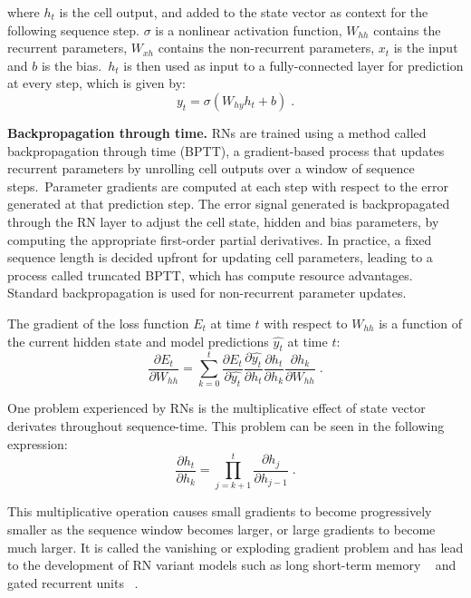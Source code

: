 \noindent where $ h_t $ is the cell output, and added to the state vector as context for the following sequence step. $ \sigma $ is a nonlinear activation function, $ W_{hh} $ contains the recurrent parameters, $ W_{xh }$ contains the non-recurrent parameters, $ x_t $ is the input and $ b $ is the bias.\ $ h_t $ is then used as input to a fully-connected layer for prediction at every step, which is given by:
\begin{equation}
	y_t = \sigma(W_{hy}h_{t} + b) \; .
\end{equation}

\noindent \textbf{Backpropagation through time.} RNs are trained using a method called backpropagation through time (BPTT),  a gradient-based process that updates recurrent parameters by unrolling cell outputs over a window of sequence steps.\ Parameter gradients are computed at each step with respect to the error generated at that prediction step. The error signal generated is backpropagated through the RN layer to adjust the cell state, hidden and bias parameters, by computing the appropriate first-order partial derivatives. In practice, a fixed sequence length is decided upfront for updating cell parameters, leading to a process called truncated BPTT, which has compute resource advantages. Standard backpropagation is used for non-recurrent parameter updates. \par

\noindent The gradient of the loss function $ E_t $ at time $ t $ with respect to $ W_{hh} $ is a function of the current hidden state and model predictions $\hat{y_t}$ at time $ t $:  
\begin{equation}
	\frac{\partial E_t} {\partial W_{hh}} = \sum_{k=0}^{t}\frac{\partial E_t} {\partial \hat{y_t}}\frac{\partial \hat{y_t}} {\partial h_t}\frac{\partial h_t} {\partial h_k}\frac{\partial h_k} {\partial W_{hh}} \; .
\end{equation}

\noindent One problem experienced by RNs is the multiplicative effect of state vector derivates throughout sequence-time. This problem can be seen in the following expression:
\begin{equation}
	\frac{\partial h_t} {\partial h_k} = \prod_{j=k+1}^t\frac{\partial h_j} {\partial h_{j-1}} \; .
\end{equation}

\noindent This multiplicative operation causes small gradients to become progressively smaller as the sequence window becomes larger, or large gradients to become much larger. It is called the vanishing or exploding gradient problem and has lead to the development of RN variant models such as long short-term memory \unskip ~\citep{hochreiter1997long} and gated recurrent units \unskip ~\citep{cho2014learning}.

